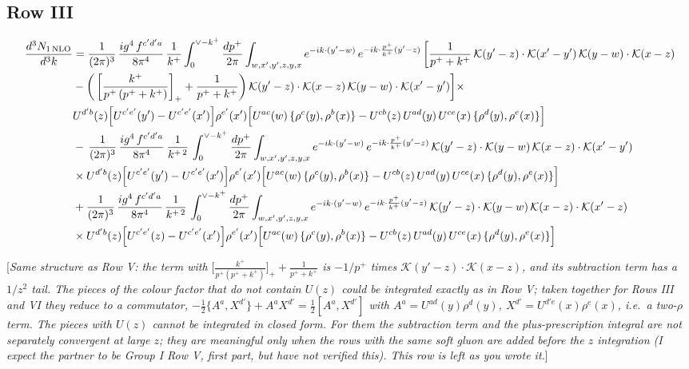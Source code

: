 \documentclass[9pt]{article}
\numberwithin{equation}{section}
\newcommand{\rnote}[1]{{\color{teal}[\textit{#1}]}}
\begin{document}
\subsection{Row III}
\begin{align}
\frac{d^{3}N_{1\,\rm NLO}}{d^{3}k} & = \frac{1}{(2\pi)^{3}}\,\frac{ig^{4}\,f^{c'd'a}}{8\pi^{4}}\,\frac{1}{k^{+}}\int_{0}^{\vee-k^{+}}\frac{dp^{+}}{2\pi}\int_{w,x',y',z,y,x}e^{-ik\cdot(y'-w)}\,e^{-ik\cdot\frac{p^{+}}{k^{+}}(y'-z)}\,\bigg[\frac{1}{p^{+}+k^{+}}\,\mathcal{K}(y'-z)\cdot\mathcal{K}(x'-y')\,\mathcal{K}(y-w)\cdot\mathcal{K}(x-z)\notag \\ & -\bigg(\left[\frac{k^{+}}{p^{+}\,(p^{+}+k^{+})}\right]_{+}+\frac{1}{p^{+}+k^{+}}\bigg)\,\mathcal{K}(y'-z)\cdot\mathcal{K}(x-z)\,\mathcal{K}(y-w)\cdot\mathcal{K}(x'-y')\bigg]\times\notag\\
&U^{d'b}(z)\Big[U^{c'e'}(y')-U^{c'e'}(x')\Big]\rho^{e'}(x')\Big[U^{ac}(w)\,\{\rho^{c}(y),\rho^{b}(x)\}-U^{cb}(z)\,U^{ad}(y)\,U^{ce}(x)\,\{\rho^{d}(y),\rho^{e}(x)\}\Big]\notag\\
&-\,\frac{1}{(2\pi)^{3}}\,\frac{ig^{4}\,f^{c'd'a}}{8\pi^{4}}\,\frac{1}{k^{+\,2}}\,\int_{0}^{\vee-k^{+}}\frac{dp^{+}}{2\pi}\int_{w,x',y',z,y,x}e^{-ik\cdot(y'-w)}\,e^{-ik\cdot\frac{p^{+}}{k^{+}}(y'-z)}\,\mathcal{K}(y'-z)\cdot\mathcal{K}(y-w)\,\mathcal{K}(x-z)\cdot\mathcal{K}(x'-y')\notag \\ & \times U^{d'b}(z)\Big[U^{c'e'}(y')-U^{c'e'}(x')\Big]\rho^{e'}(x')\Big[U^{ac}(w)\,\{\rho^{c}(y),\rho^{b}(x)\}-U^{cb}(z)\,U^{ad}(y)\,U^{ce}(x)\,\{\rho^{d}(y),\rho^{e}(x)\}\Big]\notag\\
&+\frac{1}{(2\pi)^{3}}\,\frac{ig^{4}\,f^{c'd'a}}{8\pi^{4}}\,\frac{1}{k^{+\,2}}\,\int_{0}^{\vee-k^{+}}\frac{dp^{+}}{2\pi}\int_{w,x',y',z,y,x}e^{-ik\cdot(y'-w)}\,e^{-ik\cdot\frac{p^{+}}{k^{+}}(y'-z)}\,\mathcal{K}(y'-z)\cdot\mathcal{K}(y-w)\,\mathcal{K}(x-z)\cdot\mathcal{K}(x'-z)\notag \\ & \times U^{d'b}(z)\Big[U^{c'e'}(z)-U^{c'e'}(x')\Big]\rho^{e'}(x')\Big[U^{ac}(w)\,\{\rho^{c}(y),\rho^{b}(x)\}-U^{cb}(z)\,U^{ad}(y)\,U^{ce}(x)\,\{\rho^{d}(y),\rho^{e}(x)\}\Big]
\end{align}

\rnote{Same structure as Row V: the term with $\big[\frac{k^{+}}{p^{+}(p^{+}+k^{+})}\big]_{+}+\frac{1}{p^{+}+k^{+}}$ is $-1/p^{+}$ times $\mathcal{K}(y'-z)\cdot\mathcal{K}(x-z)$, and its subtraction term has a $1/z^{2}$ tail. The pieces of the colour factor that do not contain $U(z)$ could be integrated exactly as in Row V; taken together for Rows III and VI they reduce to a commutator, $-\frac{1}{2}\{A^{a},X^{d'}\}+A^{a}X^{d'}=\frac{1}{2}[A^{a},X^{d'}]$ with $A^{a}=U^{ad}(y)\rho^{d}(y)$, $X^{d'}=U^{d'e}(x)\rho^{e}(x)$, i.e.\ a two-$\rho$ term. The pieces with $U(z)$ cannot be integrated in closed form. For them the subtraction term and the plus-prescription integral are not separately convergent at large $z$; they are meaningful only when the rows with the same soft gluon are added before the $z$ integration (I expect the partner to be Group I Row V, first part, but have not verified this). This row is left as you wrote it.}
\end{document}
